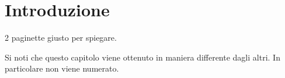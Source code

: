 \chapter*{Introduzione}


2 paginette giusto per spiegare.

Si noti che questo capitolo viene ottenuto in maniera differente
dagli altri. In particolare non viene numerato.
